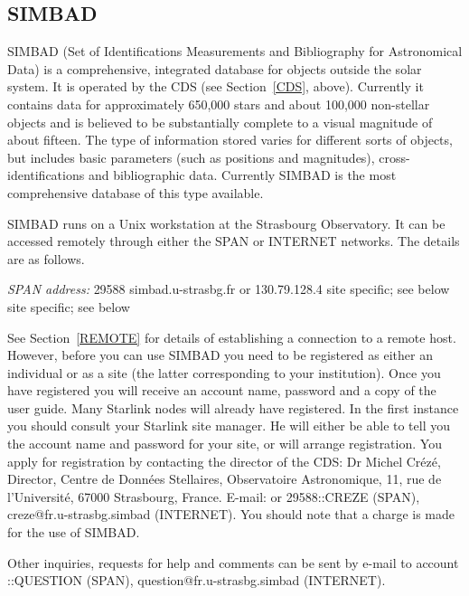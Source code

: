 \documentclass[twoside,11pt]{article}
\newcommand{\xlabel}[1]{}
\begin{document}
\subsection{SIMBAD\xlabel{simbad}}

SIMBAD (Set of Identifications Measurements and Bibliography for
Astronomical Data) is a comprehensive, integrated database for objects
outside the solar system. It is operated by the CDS (see
Section~\ref{CDS}, above). Currently it contains data for
approximately 650,000 stars and about 100,000 non-stellar objects and
is believed to be substantially complete to a visual magnitude of about
fifteen. The type of information stored varies for different sorts of
objects, but includes basic parameters (such as positions and
magnitudes), cross-identifications and bibliographic data. Currently
SIMBAD is the most comprehensive database of this type available.

SIMBAD runs on a Unix workstation at the Strasbourg Observatory. It
can be accessed remotely through either the SPAN or INTERNET networks.
The details are as follows.

{\it SPAN address: } 29588
 simbad.u-strasbg.fr or 130.79.128.4
 site specific; see below
 site specific; see below

See Section~\ref{REMOTE} for details of establishing a connection to
a remote host. However, before you can use SIMBAD you need to be
registered as either an individual or as a site (the latter
corresponding to your institution). Once you have registered you will
receive an account name, password and a copy of the user guide. Many
Starlink nodes will already have registered. In the first instance you
should consult your Starlink site manager. He will either be able to
tell you the account name and password for your site, or will arrange
registration. You apply for registration by contacting the director of
the CDS: Dr Michel Cr\'{e}z\'{e}, Director, Centre de Donn\'{e}es
Stellaires, Observatoire Astronomique, 11, rue de l'Universit\'{e},
67000 Strasbourg, France. E-mail: or 29588::CREZE (SPAN),
creze@fr.u-strasbg.simbad (INTERNET). You should note that a charge is
made for the use of SIMBAD.

Other inquiries, requests for help and comments can be sent by e-mail
to account
::QUESTION (SPAN), question@fr.u-strasbg.simbad
(INTERNET).
\end{document}
